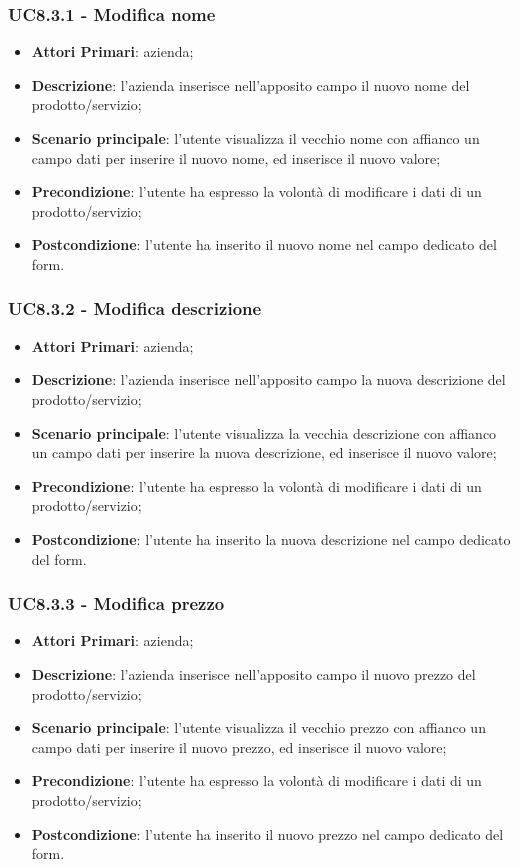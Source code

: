 \subsubsection{UC8.3.1 - Modifica nome}
\begin{itemize}
	\item \textbf{Attori Primari}: azienda;
	\item \textbf{Descrizione}: l'azienda inserisce nell'apposito campo il nuovo nome del prodotto/servizio;
	\item \textbf{Scenario principale}: l'utente visualizza il vecchio nome con affianco un campo dati per inserire il nuovo nome, ed inserisce il nuovo valore;
	\item \textbf{Precondizione}: l'utente ha espresso la volontà di modificare i dati di un prodotto/servizio;
	\item \textbf{Postcondizione}: l'utente ha inserito il nuovo nome nel campo dedicato del form.
\end{itemize}

\subsubsection{UC8.3.2 - Modifica descrizione}
\begin{itemize}
	\item \textbf{Attori Primari}: azienda;
	\item \textbf{Descrizione}: l'azienda inserisce nell'apposito campo la nuova descrizione del prodotto/servizio;
	\item \textbf{Scenario principale}: l'utente visualizza la vecchia descrizione con affianco un campo dati per inserire la nuova descrizione, ed inserisce il nuovo valore;
	\item \textbf{Precondizione}: l'utente ha espresso la volontà di modificare i dati di un prodotto/servizio;
	\item \textbf{Postcondizione}: l'utente ha inserito la nuova descrizione nel campo dedicato del form.
\end{itemize}

\subsubsection{UC8.3.3 - Modifica prezzo}
\begin{itemize}
	\item \textbf{Attori Primari}: azienda;
	\item \textbf{Descrizione}: l'azienda inserisce nell'apposito campo il nuovo prezzo del prodotto/servizio;
	\item \textbf{Scenario principale}: l'utente visualizza il vecchio prezzo con affianco un campo dati per inserire il nuovo prezzo, ed inserisce il nuovo valore;
	\item \textbf{Precondizione}: l'utente ha espresso la volontà di modificare i dati di un prodotto/servizio;
	\item \textbf{Postcondizione}: l'utente ha inserito il nuovo prezzo nel campo dedicato del form.
\end{itemize}

